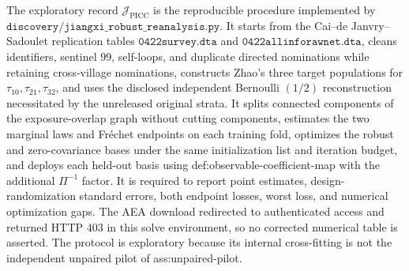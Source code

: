 The exploratory record \(\mathcal J_{\mathrm{PICC}}\) is the reproducible procedure implemented by \(\texttt{discovery/jiangxi\_robust\_reanalysis.py}\).  It starts from the Cai--de Janvry--Sadoulet replication tables \(\texttt{0422survey.dta}\) and \(\texttt{0422allinforawnet.dta}\), cleans identifiers, sentinel \(99\), self-loops, and duplicate directed nominations while retaining cross-village nominations, constructs Zhao's three target populations for \(\tau_{10},\tau_{21},\tau_{32}\), and uses the disclosed independent Bernoulli \((1/2)\) reconstruction necessitated by the unreleased original strata.  It splits connected components of the exposure-overlap graph without cutting components, estimates the two marginal laws and Fr\'echet endpoints on each training fold, optimizes the robust and zero-covariance bases under the same initialization list and iteration budget, and deploys each held-out basis using def:observable-coefficient-map with the additional \(\Pi^{-1}\) factor.  It is required to report point estimates, design-randomization standard errors, both endpoint losses, worst loss, and numerical optimization gaps.  The AEA download redirected to authenticated access and returned HTTP \(403\) in this solve environment, so no corrected numerical table is asserted.  The protocol is exploratory because its internal cross-fitting is not the independent unpaired pilot of ass:unpaired-pilot.